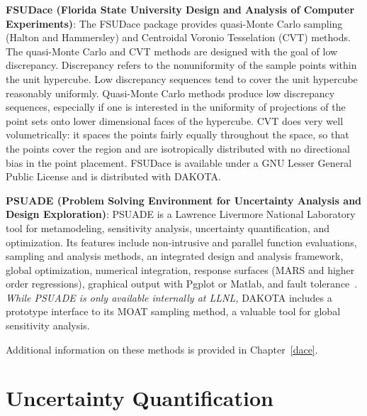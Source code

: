\textbf{FSUDace (Florida State University Design and Analysis of
Computer Experiments)}: The FSUDace package provides quasi-Monte Carlo
sampling (Halton and Hammersley) and Centroidal Voronio Tesselation
(CVT) methods.  The quasi-Monte Carlo and CVT methods are
designed with the goal of low discrepancy. Discrepancy refers to the
nonuniformity of the sample points within the unit hypercube. Low
discrepancy sequences tend to cover the unit hypercube reasonably
uniformly. Quasi-Monte Carlo methods produce low discrepancy
sequences, especially if one is interested in the uniformity of
projections of the point sets onto lower dimensional faces of the
hypercube. CVT does very well volumetrically: it spaces
the points fairly equally throughout the space, so that the points
cover the region and are isotropically distributed with no directional
bias in the point placement.
FSUDace is available under a GNU Lesser General Public
License and is distributed with DAKOTA.

\textbf{PSUADE (Problem Solving Environment for Uncertainty Analysis
and Design Exploration)}: PSUADE is a Lawrence Livermore National
Laboratory tool for metamodeling, sensitivity analysis, uncertainty
quantification, and optimization.  Its features include non-intrusive
and parallel function evaluations, sampling and analysis methods, an
integrated design and analysis framework, global optimization,
numerical integration, response surfaces (MARS and higher order
regressions), graphical output with Pgplot or Matlab, and fault
tolerance~\cite{Ton05}.  \emph{While PSUADE is only available
internally at LLNL,} DAKOTA includes a prototype interface to its MOAT
sampling method, a valuable tool for global sensitivity analysis.

Additional information on these methods is provided in Chapter~\ref{dace}.

\section{Uncertainty Quantification}\label{capabilities:uncertainty}

